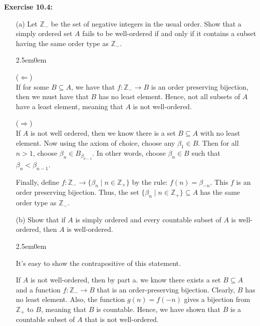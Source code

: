 \documentclass{book}
\newcommand{\exTwo}{%
\color{Purple}%
   \fontsize{13}{15}\selectfont%
}
\newenvironment{myIndent}{%
   \begin{adjustwidth}{2.5em}{0em}%
}{%
   \end{adjustwidth}%
}
\newcommand{\blab}[1]{\textbf{#1}}
\newcommand{\retTwo}{\hfill\bigbreak}
\begin{document}
   \blab{Exercise 10.4:}
   \begin{itemize}
      \item[(a)] Let $\mathbb{Z}_-$ be the set of negative integers in the usual order. Show that a simply ordered set $A$ fails to be well-ordered if and only if it contains a subset having the same order type as $\mathbb{Z}_-$.
      
      
      \begin{myIndent}\exTwo
         ($\Longleftarrow$)\\
         If for some $B \subseteq A$, we have that $f: \mathbb{Z}_- \longrightarrow B$ is an order preserving bijection, then we must have that $B$ has no least element. Hence, not all subsets of $A$ have a least element, meaning that $A$ is not well-ordered.\retTwo

         ($\Longrightarrow$)\\
         If $A$ is not well ordered, then we know there is a set $B \subseteq A$ with no least element. Now using the axiom of choice, choose any $\beta_1 \in B$. Then for all\\ $n > 1$, choose $\beta_n \in B_{\beta_{n-1}}$. In other words, choose $\beta_n \in B$ such that\\ $\beta_n < \beta_{n-1}$.\newpage
         
         Finally, define $f: \mathbb{Z}_- \longrightarrow \{\beta_n \mid n \in \mathbb{Z}_+\}$ by the rule: $f(n) = \beta_{-n}$. This $f$ is an order preserving bijection. Thus, the set $\{\beta_n \mid n \in \mathbb{Z}_+\} \subseteq A$ has the same order type as $\mathbb{Z}_-$.\retTwo
      \end{myIndent}

      \item[(b)] Show that if $A$ is simply ordered and every countable subset of $A$ is well-ordered, then $A$ is well-ordered.
      
      \begin{myIndent}\exTwo
         It's easy to show the contrapositive of this statement.\retTwo

         If $A$ is not well-ordered, then by part a. we know there exists a set $B \subseteq A$ and a function $f: \mathbb{Z}_- \longrightarrow B$ that is an order-preserving bijection. Clearly, $B$ has no least element. Also, the function $g(n) = f(-n)$ gives a bijection from $\mathbb{Z}_+$ to $B$, meaning that $B$ is countable. Hence, we have shown that $B$ is a countable subset of $A$ that is not well-ordered.\retTwo\retTwo
      \end{myIndent}
   \end{itemize}
\end{document}
